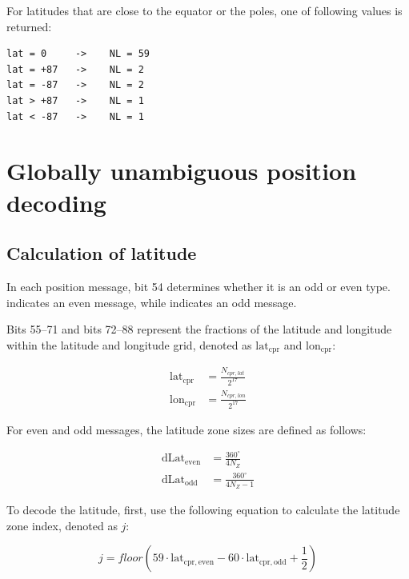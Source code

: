 For latitudes that are close to the equator or the poles, one of following values is returned:

\begin{verbatim}
lat = 0     ->    NL = 59
lat = +87   ->    NL = 2
lat = -87   ->    NL = 2
lat > +87   ->    NL = 1
lat < -87   ->    NL = 1
\end{verbatim}


\section{Globally unambiguous position decoding} 

\subsection{Calculation of latitude} \label{sec:cpr_airborne_global_lat}

In each position message, bit 54 determines whether it is an odd or even type. \0 indicates an even message, while \1 indicates an odd message.

Bits 55--71 and bits 72--88 represent the fractions of the latitude and longitude within the latitude and longitude grid, denoted as $\mathrm{lat}_\mathrm{cpr}$ and $\mathrm{lon}_\mathrm{cpr}$:

\begin{equation}
  \begin{split}
      \mathrm{lat}_\mathrm{cpr} &= \frac{N_{cpr,lat}}{2^{17}} \\
    \mathrm{lon}_\mathrm{cpr} &= \frac{N_{cpr,lon}}{2^{17}}
  \end{split}
\end{equation}


For even and odd messages, the latitude zone sizes are defined as follows:

\begin{equation}
\begin{split}
  \mathrm{dLat}_\mathrm{even} &= \frac{360^\circ}{4 N_Z} \\
  \mathrm{dLat}_\mathrm{odd} &= \frac{360^\circ}{4 N_Z - 1}
\end{split}
\end{equation}


To decode the latitude, first, use the following equation to calculate the latitude zone index, denoted as $j$:

\begin{equation}
  j = floor \left( 59 \cdot \mathrm{lat}_\mathrm{cpr, even} - 60 \cdot \mathrm{lat}_\mathrm{cpr,odd} + \frac{1}{2}  \right)
\end{equation}


